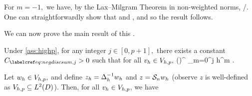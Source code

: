 For $m=-1,$ we have, by the Lax--Milgram Theorem in non-weighted norms,
\beqs
\NHoD{\Sn \ftilde} \leq {}/\Amin.
\eeqs
One can straightforwardly show that
\beqs
{} \leq {} \NHoD{\Sn \ftilde}
\eeqs
and
\beqs
{} \leq {} ,
\eeqs
and so the result follows.
\epf



We can now prove the main result of this .

\label{lem:negdiscsum}
Under \cref{ass:highp}, for any integer $j \in [0,p+1],$ there exists a constant $\Csumj > 0$ such that for all $v_{h} \in V_{h,p},$
\beq\label{eq:negdiscsum}
 \leq \Csumj\mleft(\En\nvar\mright)^{} \sum_{m=0}^j h^{m} .
\eeq
\ele

Let $w_{h} \in V_{h,p},$ and define $z_{h} = \Delta_{h}^{-1} w_{h}$ and $z = \mathcal S_{n} w_{h}$ (observe $z$ is well-defined as $\Vhp \subseteq \LtD$). Then, for all $v_{h} \in V_{h,p}$, we have

